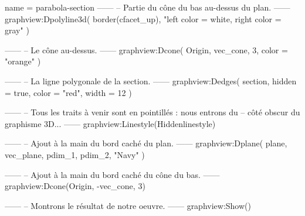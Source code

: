 \documentclass{standalone}
\begin{document}
\begin{luadraw}{name = parabola-section}
------
-- Partie du cône du bas au-dessus du plan.
------
graphview:Dpolyline3d(
  border(cfacet_up),
  "left color = white, right color = gray"
)

------
-- Le cône au-dessus.
------
graphview:Dcone(
  Origin, vec_cone, 3,
  {
    color = "orange"
  }
)

------
-- La ligne polygonale de la section.
------
graphview:Dedges(
  section,
  {
    hidden = true, color = "red", width = 12
  }
)

------
-- Tous les traits à venir sont en pointillés : nous entrons du
-- côté obscur du graphisme 3D...
------
graphview:Linestyle(Hiddenlinestyle)

------
-- Ajout à la main du bord caché du plan.
------
graphview:Dplane(
  plane,
  vec_plane, pdim_1, pdim_2,
  "Navy"
)

------
-- Ajout à la main du bord caché du cône du bas.
------
graphview:Dcone(Origin, -vec_cone, 3)

------
-- Montrons le résultat de notre oeuvre.
------
graphview:Show()
\end{luadraw}
\end{document}
